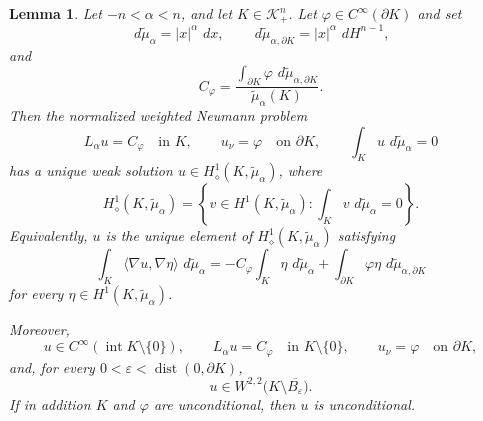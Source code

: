 \documentclass[12pt,leqno]{amsart}
\theoremstyle{plain} \newtheorem{thm}{Theorem}[section]
\theoremstyle{plain} \newtheorem{prop}[thm]{Proposition}
\theoremstyle{plain} \newtheorem{prob}[thm]{Problem}
\theoremstyle{definition} \newtheorem{defi}[thm]{Definition}
\theoremstyle{plain} \newtheorem{cor}[thm]{Corollary}
\theoremstyle{plain} \newtheorem{lem}[thm]{Lemma}
\theoremstyle{plain} \newtheorem{eg}{Example}[section]
\theoremstyle{remark} \newtheorem{rmk}[thm]{Remark}
\theoremstyle{plain} \newtheorem{conj}{Conjecture}
\numberwithin{equation}{section}
\newcommand{\dd}{\,d}
\begin{document}
\begin{lem}\label{lem-neumann}
  Let $-n<\alpha<n$, and let $K\in\mathcal{K}_{+}^n$. Let
  $\varphi\in C^\infty(\partial K)$ and set
  \[
    \dd\tilde{\mu}_\alpha=|x|^\alpha\,\dd x,
    \qquad
    \dd\tilde{\mu}_{\alpha,\partial K}
    =
    |x|^\alpha\,\dd H^{n-1},
  \]
  and
  \[
    C_\varphi
    =
    \frac{
      \int_{\partial K}\varphi\,\dd\tilde{\mu}_{\alpha,\partial K}}
    {      \tilde{\mu}_\alpha(K)}.
  \]
  Then the normalized weighted Neumann problem
  \[
    L_\alpha u=C_\varphi\quad\text{in }K,
    \qquad
    u_\nu=\varphi\quad\text{on }\partial K,
    \qquad
    \int_K u\,\dd\tilde{\mu}_\alpha=0
  \]
  has a unique weak solution
  $u\in H^1_\diamond(K,\tilde{\mu}_\alpha)$, where
  \[
    H^1_\diamond(K,\tilde{\mu}_\alpha)
    =
    \left\{
      v\in H^1(K,\tilde{\mu}_\alpha):
      \int_K v\,\dd\tilde{\mu}_\alpha=0
    \right\}.
  \]
  Equivalently, $u$ is the unique element of
  $H^1_\diamond(K,\tilde{\mu}_\alpha)$ satisfying
  \begin{equation}\label{eq-neumann-weak}
    \int_K\langle\nabla u,\nabla\eta\rangle\,
    \dd\tilde{\mu}_\alpha
    =
    -C_\varphi\int_K\eta\,\dd\tilde{\mu}_\alpha
    +
    \int_{\partial K}\varphi\eta\,
    \dd\tilde{\mu}_{\alpha,\partial K}
  \end{equation}
  for every $\eta\in H^1(K,\tilde{\mu}_\alpha)$.

    Moreover,
  \[
    u\in C^\infty(\operatorname{int}K\setminus\{0\}),
    \qquad
    L_\alpha u=C_\varphi\quad\text{in }K\setminus\{0\},
    \qquad
    u_\nu=\varphi\quad\text{on }\partial K,
  \]
  and, for every $0<\varepsilon<\operatorname{dist}(0,\partial K)$,
  \[
    u\in W^{2,2}\bigl(K\setminus\overline{B_\varepsilon}\bigr).
  \]
  If in addition $K$ and $\varphi$ are unconditional, then $u$ is
  unconditional.
\end{lem}
\end{document}
